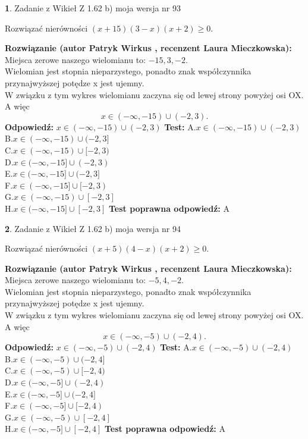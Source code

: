 \documentclass[12pt, a4paper]{article}
\theoremstyle{definition} %
\newtheorem{zad}{}
\newcommand{\zadStart}[1]{\begin{zad}#1\newline}
\newcommand{\zadStop}{\end{zad}}
\newcommand{\rozwStart}[2]{\noindent \textbf{Rozwiązanie (autor #1 , recenzent #2): }\newline}
\newcommand{\rozwStop}{\newline}
\newcommand{\odpStart}{\noindent \textbf{Odpowiedź:}\newline}
\newcommand{\odpStop}{\newline}
\newcommand{\testStart}{\noindent \textbf{Test:}\newline}
\newcommand{\testStop}{\newline}
\newcommand{\kluczStart}{\noindent \textbf{Test poprawna odpowiedź:}\newline}
\newcommand{\kluczStop}{\newline}
\begin{document}
\zadStart{Zadanie z Wikieł Z 1.62 b) moja wersja nr 93}

Rozwiązać nierówności $(x+15)(3-x)(x+2)\ge0$.
\zadStop
\rozwStart{Patryk Wirkus}{Laura Mieczkowska}
Miejsca zerowe naszego wielomianu to: $-15, 3, -2$.\\
Wielomian jest stopnia nieparzystego, ponadto znak współczynnika przy\linebreak najwyższej potędze x jest ujemny.\\ W związku z tym wykres wielomianu zaczyna się od lewej strony powyżej osi OX. A więc $$x \in (-\infty,-15) \cup (-2,3).$$
\rozwStop
\odpStart
$x \in (-\infty,-15) \cup (-2,3)$
\odpStop
\testStart
A.$x \in (-\infty,-15) \cup (-2,3)$\\
B.$x \in (-\infty,-15) \cup (-2,3]$\\
C.$x \in (-\infty,-15) \cup [-2,3)$\\
D.$x \in (-\infty,-15] \cup (-2,3)$\\
E.$x \in (-\infty,-15] \cup (-2,3]$\\
F.$x \in (-\infty,-15] \cup [-2,3)$\\
G.$x \in (-\infty,-15) \cup [-2,3]$\\
H.$x \in (-\infty,-15] \cup [-2,3]$
\testStop
\kluczStart
A
\kluczStop



\zadStart{Zadanie z Wikieł Z 1.62 b) moja wersja nr 94}

Rozwiązać nierówności $(x+5)(4-x)(x+2)\ge0$.
\zadStop
\rozwStart{Patryk Wirkus}{Laura Mieczkowska}
Miejsca zerowe naszego wielomianu to: $-5, 4, -2$.\\
Wielomian jest stopnia nieparzystego, ponadto znak współczynnika przy\linebreak najwyższej potędze x jest ujemny.\\ W związku z tym wykres wielomianu zaczyna się od lewej strony powyżej osi OX. A więc $$x \in (-\infty,-5) \cup (-2,4).$$
\rozwStop
\odpStart
$x \in (-\infty,-5) \cup (-2,4)$
\odpStop
\testStart
A.$x \in (-\infty,-5) \cup (-2,4)$\\
B.$x \in (-\infty,-5) \cup (-2,4]$\\
C.$x \in (-\infty,-5) \cup [-2,4)$\\
D.$x \in (-\infty,-5] \cup (-2,4)$\\
E.$x \in (-\infty,-5] \cup (-2,4]$\\
F.$x \in (-\infty,-5] \cup [-2,4)$\\
G.$x \in (-\infty,-5) \cup [-2,4]$\\
H.$x \in (-\infty,-5] \cup [-2,4]$
\testStop
\kluczStart
A
\kluczStop
\end{document}
